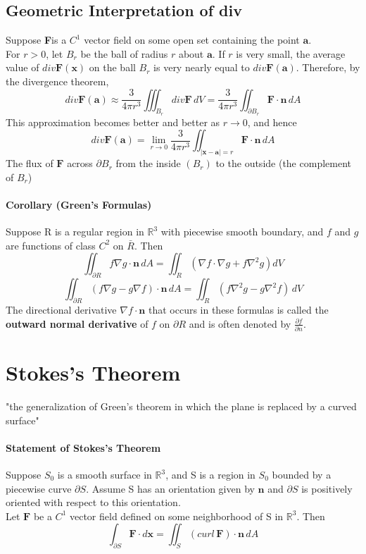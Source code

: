 \documentclass[11pt]{article}
\newcommand{\tb}[1]{\textbf{#1}}
\newcommand{\real}[0]{\mathbb{R}}
\newcommand{\vx}[0]{\tb{x}}
\newcommand{\va}[0]{\tb{a}}
\newcommand{\vf}[0]{\tb{F}}
\newcommand{\vn}[0]{\tb{n}}
\newcommand{\p}[0]{\partial}
\begin{document}
\subsection{Geometric Interpretation of div}
Suppose \vf is a $C^1$ vector field on some open set containing the point $\va$.\\
For $r > 0$, let $B_r$ be the ball of radius $r$ about $\va$. If $r$ is very small, the average value of $div \vf(\vx)$ on the ball $B_r$ is very nearly equal to $div\vf(\va)$. Therefore, by the divergence theorem,
$$div \vf(\va) \approx \frac{3}{4\pi r^3}\iiint_{B_r} div\vf \, dV = \frac{3}{4\pi r^3} \iint_{\partial B_r}\vf \cdot \vn \, dA$$
This approximation becomes better and better as $r \rightarrow 0$, and hence
$$div \vf(\va) = \underset{r\rightarrow 0}{\lim}\frac{3}{4 \pi r^3} \iint_{|\vx - \va| = r} \vf \cdot \vn \, dA$$
The flux of $\vf$ across $\partial B_r$ from the inside $(B_r) $ to the outside (the complement of $B_r$)




\paragraph{Corollary (Green's Formulas)} Suppose R is a regular region in $\real^3$ with piecewise smooth boundary, and $f$ and $g$ are functions of class $C^2$ on $\bar R$. Then
$$\iint_{\p R}f\nabla g\cdot \tb{n}\,dA = \iint_R(\nabla f \cdot \nabla g + f\nabla^2g)dV$$
$$\iint_{\p R} (f\nabla g - g\nabla f)\cdot\tb{n}\,dA = \iint_R(f\nabla^2g -g\nabla^2f)\,dV$$
The directional derivative $\nabla f\cdot\tb{n}$ that occurs in these formulas is called the \tb{outward normal derivative} of $f$ on $\p R$ and is often denoted by $\frac{\p f}{\p n}$.

\section{Stokes's Theorem}
"the generalization of Green's theorem in which the plane is replaced by a curved surface"
\paragraph{Statement of Stokes's Theorem} Suppose $S_0$ is a smooth surface in $\real^3$, and S is a region in $S_0$ bounded by a piecewise curve $\partial S$. Assume S has an orientation given by $\tb{n}$ and $\partial S$ is positively oriented with respect to this orientation.\\
Let $\tb{F}$ be a $C^1$ vector field defined on some neighborhood of S in $\real^3$. Then
$$\int_{\partial S} \tb{F}\cdot d\vx = \iint_S (curl \, \vf)\cdot \tb{n} \,dA$$
\end{document}
